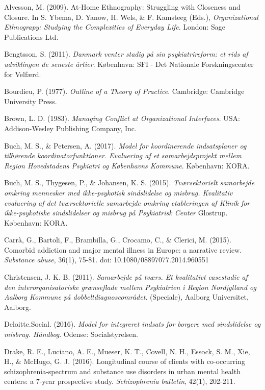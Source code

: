 \label{paper6:references}
\begin{thebibliography}{99}

\item Alvesson, M. (2009). At-Home Ethnography: Struggling with Closeness and Closure. In S. Ybema, D. Yanow, H. Wels, \& F. Kamsteeg (Eds.), \textit{Organizational Ethnograpy: Studying the Complexities of Everyday Life}. London: Sage Publications Ltd.
\item Bengtsson, S. (2011). \textit{Danmark venter stadig på sin psykiatrireform: et rids af udviklingen de seneste årtier}. København: SFI - Det Nationale Forskningscenter for Velfærd.
\item Bourdieu, P. (1977). \textit{Outline of a Theory of Practice}. Cambridge: Cambridge University Press.
\item Brown, L. D. (1983). \textit{Managing Conflict at Organizational Interfaces}. USA: Addison-Wesley Publishing Company, Inc.
\item Buch, M. S., \& Petersen, A. (2017). \textit{Model for koordinerende indsatsplaner og tilhørende koordinatorfunktioner. Evaluering af et samarbejdsprojekt mellem Region Hovedstadens Psykiatri og Københavns Kommune}. København: KORA.
\item Buch, M. S., Thygesen, P., \& Johansen, K. S. (2015). \textit{Tværsektorielt samarbejde omkring mennesker med ikke-psykotisk sindslidelse og misbrug. Kvalitativ evaluering af det tværsektorielle samarbejde omkring etableringen af Klinik for ikke-psykotiske sindslidelser og misbrug på Psykiatrisk Center} Glostrup. København: KORA.
\item Carrà, G., Bartoli, F., Brambilla, G., Crocamo, C., \& Clerici, M. (2015). Comorbid addiction and major mental illness in Europe: a narrative review. \textit{Substance abuse}, 36(1), 75-81. doi: 10.1080/08897077.2014.960551
\item Christensen, J. K. B. (2011). \textit{Samarbejde på tværs. Et kvalitativt casestudie af den interorganisatoriske grænseflade mellem Psykiatrien i Region Nordjylland og Aalborg Kommune på dobbeltdiagnoseområdet}. (Speciale), Aalborg Universitet, Aalborg.   
\item Deloitte.Social. (2016). \textit{Model for integreret indsats for borgere med sindslidelse og misbrug. Håndbog}. Odense: Socialstyrelsen.
\item Drake, R. E., Luciano, A. E., Mueser, K. T., Covell, N. H., Essock, S. M., Xie, H., \& McHugo, G. J. (2016). Longitudinal course of clients with co-occurring schizophrenia-spectrum and substance use disorders in urban mental health centers: a 7-year prospective study. \textit{Schizophrenia bulletin}, 42(1), 202-211. 

\end{thebibliography}
